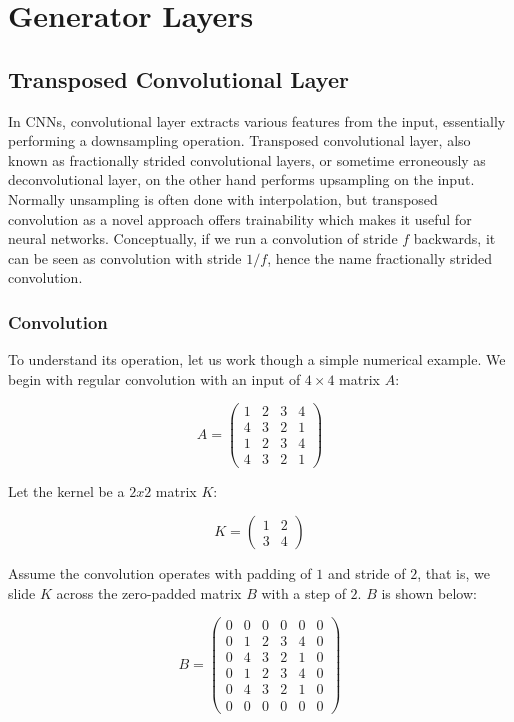 
\chapter{Generator Layers}

\section{Transposed Convolutional Layer}

In CNNs, convolutional layer extracts various features from the input, essentially performing a downsampling
operation. Transposed convolutional layer, also known as fractionally strided convolutional layers, or sometime
erroneously as deconvolutional layer, on the other hand performs upsampling on the input. Normally unsampling
is often done with interpolation, but transposed convolution as a novel approach offers trainability which
makes it useful for neural networks. Conceptually, if we run a convolution of stride $f$ backwards,
it can be seen as convolution with stride $1/f$, hence the name fractionally strided convolution.

\subsection{Convolution}

To understand its operation, let us work though a simple numerical example. We begin with regular convolution
with an input of $4 \times 4$ matrix $A$:

$$
A =
  \begin{pmatrix}
    1 & 2 & 3 & 4 \\
    4 & 3 & 2 & 1 \\
    1 & 2 & 3 & 4 \\
    4 & 3 & 2 & 1
  \end{pmatrix}
$$

Let the kernel be a $2x2$ matrix $K$:

$$
K =
  \begin{pmatrix}
    1 & 2 \\
    3 & 4
  \end{pmatrix}
$$

Assume the convolution operates with padding of $1$ and stride of $2$, that is, we slide $K$ across the
zero-padded matrix $B$ with a step of $2$. $B$ is shown below:

$$
B =
  \begin{pmatrix}
    0 & 0 & 0 & 0 & 0 & 0 \\
    0 & 1 & 2 & 3 & 4 & 0 \\
    0 & 4 & 3 & 2 & 1 & 0 \\
    0 & 1 & 2 & 3 & 4 & 0 \\
    0 & 4 & 3 & 2 & 1 & 0 \\
    0 & 0 & 0 & 0 & 0 & 0
  \end{pmatrix}
$$

